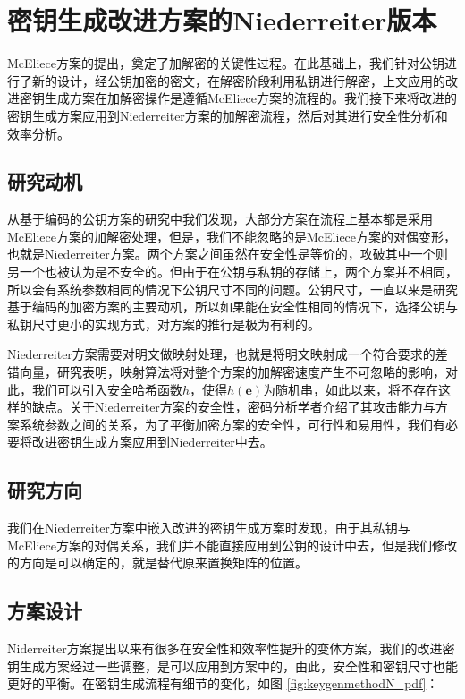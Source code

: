 \chapter{密钥生成改进方案的Niederreiter版本}
McEliece方案的提出，奠定了加解密的关键性过程。在此基础上，我们针对公钥进行了新的设计，经公钥加密的密文，在解密阶段利用私钥进行解密，上文应用的改进密钥生成方案在加解密操作是遵循McEliece方案的流程的。我们接下来将改进的密钥生成方案应用到Niederreiter方案的加解密流程，然后对其进行安全性分析和效率分析。

\section{研究动机}
从基于编码的公钥方案的研究中我们发现，大部分方案在流程上基本都是采用McEliece方案的加解密处理，但是，我们不能忽略的是McEliece方案的对偶变形，也就是Niederreiter方案。两个方案之间虽然在安全性是等价的，攻破其中一个则另一个也被认为是不安全的。但由于在公钥与私钥的存储上，两个方案并不相同，所以会有系统参数相同的情况下公钥尺寸不同的问题。公钥尺寸，一直以来是研究基于编码的加密方案的主要动机，所以如果能在安全性相同的情况下，选择公钥与私钥尺寸更小的实现方式，对方案的推行是极为有利的。

Niederreiter方案需要对明文做映射处理，也就是将明文映射成一个符合要求的差错向量，研究表明，映射算法将对整个方案的加解密速度产生不可忽略的影响，对此，我们可以引入安全哈希函数$h$，使得$h(\mathbf{e})$为随机串，如此以来，将不存在这样的缺点。关于Niederreiter方案的安全性，密码分析学者介绍了其攻击能力与方案系统参数之间的关系，为了平衡加密方案的安全性，可行性和易用性，我们有必要将改进密钥生成方案应用到Niederreiter中去。

\section{研究方向}
我们在Niederreiter方案中嵌入改进的密钥生成方案时发现，由于其私钥与McEliece方案的对偶关系，我们并不能直接应用到公钥的设计中去，但是我们修改的方向是可以确定的，就是替代原来置换矩阵的位置。

\section{方案设计}
Niderreiter方案提出以来有很多在安全性和效率性提升的变体方案，我们的改进密钥生成方案经过一些调整，是可以应用到方案中的，由此，安全性和密钥尺寸也能更好的平衡。在密钥生成流程有细节的变化，如图 \ref{fig:keygenmethodN_pdf}：

